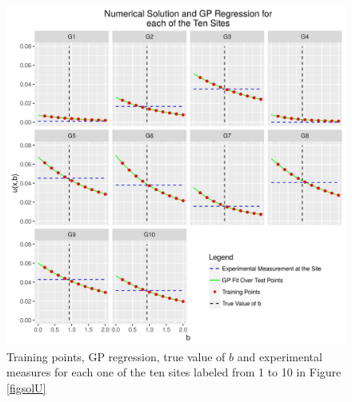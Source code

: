 \documentclass{sfuthesis}
\begin{document}
\begin{figure}[H]
\centering
\includegraphics[scale=0.7]{./FigChap3/fitted}
\caption{Training points, GP regression, true value of $b$ and experimental measures for each one of the ten sites labeled
from 1 to 10 in Figure \ref{figsolU}}
\label{fignofitted}
\end{figure}
\end{document}
